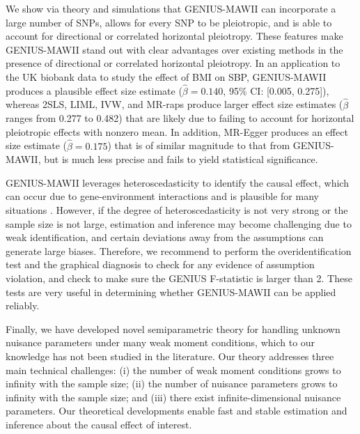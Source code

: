\documentclass[12pt]{article}
\begin{document}
{We show via theory and simulations that GENIUS-MAWII can incorporate a large number of SNPs, allows for every SNP to be pleiotropic,  and is able to account for directional or correlated  horizontal pleiotropy.  These features make GENIUS-MAWII stand out with clear advantages over existing methods in the presence of directional or correlated horizontal pleiotropy.   In an application to the UK biobank data to study the effect of BMI on SBP,  GENIUS-MAWII produces a plausible effect size estimate ($ \hat\beta= 0.140 $, 95\% CI: [0.005, 0.275]), whereas 2SLS, LIML, IVW, and MR-raps produce larger effect size estimates ($ \hat\beta $ ranges from 0.277 to 0.482) that are likely due to failing to account for horizontal pleiotropic effects with nonzero mean. In addition, MR-Egger produces an effect size estimate ($ \hat\beta= 0.175 $) that is of similar magnitude to that from GENIUS-MAWII, but is much less precise and fails to yield statistical significance. 
 
 
 {
GENIUS-MAWII leverages  heteroscedasticity to identify the causal effect, which can occur due to gene-environment interactions and is plausible for many situations \citep{pare2010use,wang2019genotype,sulc2020quantification}. However, if  the degree of heteroscedasticity is not very strong or the sample size is not large, estimation and inference may become challenging due to weak identification, and certain deviations away from the assumptions can generate large biases. Therefore, we recommend to perform the overidentification test and the graphical diagnosis to check for any evidence of assumption violation, and check to make sure the GENIUS F-statistic is larger than 2. These tests are very useful in determining whether GENIUS-MAWII can be applied reliably.
}
 

 

 
  Finally, we have developed novel semiparametric theory for handling unknown nuisance parameters under many weak moment conditions,  which to our knowledge has not been studied in the literature. Our theory addresses three main technical challenges: (i) the number of weak moment conditions grows to infinity with the sample size; (ii) the number of nuisance parameters grows to infinity with the sample size; and (iii) there exist infinite-dimensional nuisance parameters.  Our theoretical developments enable fast and stable estimation and inference about the causal effect of interest.
 
 
% 
 
}
\end{document}
